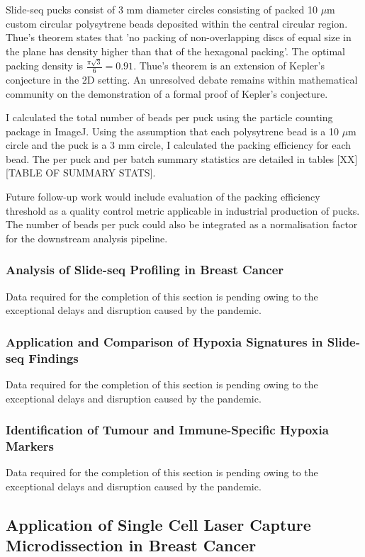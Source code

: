 Slide-seq pucks consist of 3 mm diameter circles consisting of packed 10 $\mu$m custom circular polysytrene beads deposited within the central circular region. Thue's theorem states that 'no packing of non-overlapping discs of equal size in the plane has density higher than that of the hexagonal packing'. The optimal packing density is $\frac{\pi \sqrt{3}}{6} = 0.91$. Thue's theorem is an extension of Kepler's conjecture in the 2D setting. An unresolved debate remains within mathematical community on the demonstration of a formal proof of Kepler's conjecture.

I calculated the total number of beads per puck using the particle counting package in ImageJ. Using the assumption that each polysytrene bead is a 10 $\mu$m circle and the puck is a 3 mm circle, I calculated the packing efficiency for each bead. The per puck and per batch summary statistics are detailed in tables [XX] [TABLE OF SUMMARY STATS].


Future follow-up work would include evaluation of the packing efficiency threshold as a quality control metric applicable in industrial production of pucks. The number of beads per puck could also be integrated as a normalisation factor for the downstream analysis pipeline.

\subsubsection{Analysis of Slide-seq Profiling in Breast Cancer}
Data required for the completion of this section is pending owing to the exceptional delays and disruption caused by the pandemic. 

\subsubsection{Application and Comparison of Hypoxia Signatures in Slide-seq Findings}
Data required for the completion of this section is pending owing to the exceptional delays and disruption caused by the pandemic. 

\subsubsection{Identification of Tumour and Immune-Specific Hypoxia Markers}
Data required for the completion of this section is pending owing to the exceptional delays and disruption caused by the pandemic. 

\subsection{Application of Single Cell Laser Capture Microdissection in Breast Cancer}
